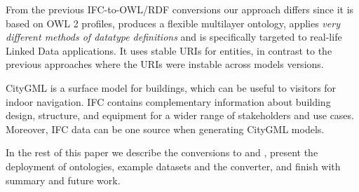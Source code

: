 

From the previous IFC-to-OWL/RDF conversions
\cite{beetz2005ontology,beetz2009ifcowl,pauwels2011interoperability} our approach differs since it
is based on OWL 2 profiles, produces a flexible multilayer ontology, applies \emph{very different methods of data\-type definitions} and is specifically targeted to
real-life Linked Data applications. It uses stable URIs for entities, in contrast to the previous approaches
where the URIs were instable across models versions.

CityGML \cite{kolbe2005citygml} is a surface model for buildings, which can be useful to visitors for 
indoor navigation. IFC contains complementary information about building design, structure, 
and equipment for a wider range of stakeholders and use cases. Moreover, IFC data can be one source 
when generating CityGML models. %

In the rest of this paper we describe the conversions to \ifcowl{} and \ifcrdf{}, present the deployment of ontologies, example datasets and the converter, and finish with summary and future work. 


% 
